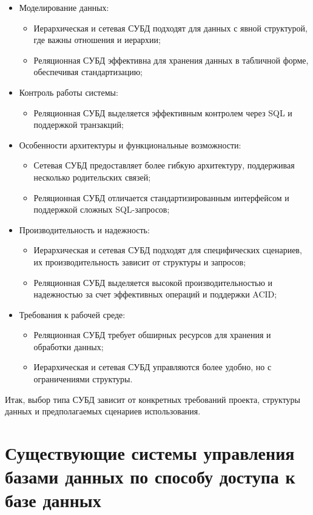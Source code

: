 \begin{itemize}
	\item Моделирование данных:
	\begin{itemize}
		\item Иерархическая и сетевая СУБД подходят для данных с явной структурой, где важны отношения и иерархии;
		\item Реляционная СУБД эффективна для хранения данных в табличной форме, обеспечивая стандартизацию;
	\end{itemize}
	\item Контроль работы системы:
	\begin{itemize}
		\item Реляционная СУБД выделяется эффективным контролем через SQL и поддержкой транзакций;
	\end{itemize}
	\item Особенности архитектуры и функциональные возможности:
	\begin{itemize}
		\item Сетевая СУБД предоставляет более гибкую архитектуру, поддерживая несколько родительских связей;
		\item Реляционная СУБД отличается стандартизированным интерфейсом и поддержкой сложных SQL-запросов;
	\end{itemize}
	\item Производительность и надежность:
	\begin{itemize}
		\item Иерархическая и сетевая СУБД подходят для специфических сценариев, их производительность зависит от структуры и запросов;
		\item Реляционная СУБД выделяется высокой производительностью и надежностью за счет эффективных операций и поддержки ACID;
	\end{itemize}
	\item Требования к рабочей среде:
	\begin{itemize}
		\item Реляционная СУБД требует обширных ресурсов для хранения и обработки данных;
		\item Иерархическая и сетевая СУБД управляются более удобно, но с ограничениями структуры.
	\end{itemize}
\end{itemize}
Итак, выбор типа СУБД зависит от конкретных требований проекта, структуры данных и предполагаемых сценариев использования.
\clearpage
\section{Существующие системы управления базами данных по способу доступа к базе данных}
